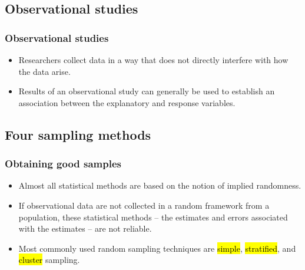 
\subsection{Observational studies}


\begin{frame}
\frametitle{Observational studies}

\begin{itemize}

\item Researchers collect data in a way that does not directly interfere with how the data arise.

\item Results of an observational study can generally be used to establish an association between the explanatory and response variables.

\end{itemize}

\end{frame}


\subsection{Four sampling methods}


\begin{frame}
\frametitle{Obtaining good samples}

\begin{itemize}

\item Almost all statistical methods are based on the notion of implied randomness. 

\item If observational data are not collected in a random framework from a population, these statistical methods -- the estimates and errors associated with the estimates -- are not reliable.

\item Most commonly used random sampling techniques are \hl{simple}, \hl{stratified}, and \hl{cluster} sampling.

\end{itemize}

\end{frame}

